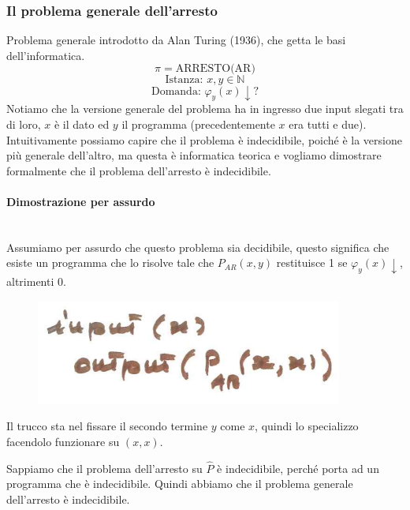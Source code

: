 \documentclass{article}
\begin{document}
\subsubsection{Il problema generale dell'arresto}
Problema generale introdotto da Alan Turing (1936), che getta le basi dell'informatica.
$$\pi=\text{ARRESTO(AR)}$$
$$\text{Istanza: }x,y\in\mathbb{N}$$
$$\text{Domanda: }\varphi_y(x)\downarrow?$$
Notiamo che la versione generale del problema ha in ingresso due input slegati tra di loro,
$x$ è il dato ed $y$ il programma (precedentemente $x$ era tutti e due). Intuitivamente
possiamo capire che il problema è indecidibile, poiché è la versione più generale dell'altro,
ma questa è informatica teorica e vogliamo dimostrare formalmente che il problema dell'arresto
è indecidibile.

\paragraph{Dimostrazione per assurdo}\mbox{}\\
Assumiamo per assurdo che questo problema sia decidibile, questo significa che esiste
un programma che lo risolve tale che $P_{AR}(x,y)$ restituisce 1 se $\varphi_{y}(x)\downarrow$,
altrimenti 0.
\begin{figure}[H]
    \centering
    \includegraphics[scale=0.65]{images/prob_gen_ind.png}
\end{figure}
Il trucco sta nel fissare il secondo termine $y$ come $x$, quindi lo specializzo facendolo
funzionare su $(x,x)$.

Sappiamo che il problema dell'arresto su $\hat{P}$ è indecidibile, perché porta ad un programma
che è indecidibile. Quindi abbiamo che il problema generale dell'arresto è indecidibile.
\end{document}
